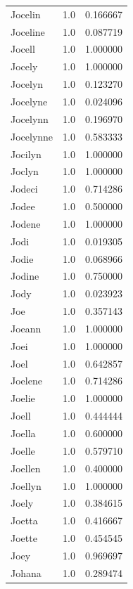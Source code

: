 \documentclass[
  letterpaper,
  DIV=11,
  numbers=noendperiod]{scrreprt}
\begin{document}
\begin{tabular}{lrr}
Jocelin         &   1.0 &   0.166667 \\
Joceline        &   1.0 &   0.087719 \\
Jocell          &   1.0 &   1.000000 \\
Jocely          &   1.0 &   1.000000 \\
Jocelyn         &   1.0 &   0.123270 \\
Jocelyne        &   1.0 &   0.024096 \\
Jocelynn        &   1.0 &   0.196970 \\
Jocelynne       &   1.0 &   0.583333 \\
Jocilyn         &   1.0 &   1.000000 \\
Joclyn          &   1.0 &   1.000000 \\
Jodeci          &   1.0 &   0.714286 \\
Jodee           &   1.0 &   0.500000 \\
Jodene          &   1.0 &   1.000000 \\
Jodi            &   1.0 &   0.019305 \\
Jodie           &   1.0 &   0.068966 \\
Jodine          &   1.0 &   0.750000 \\
Jody            &   1.0 &   0.023923 \\
Joe             &   1.0 &   0.357143 \\
Joeann          &   1.0 &   1.000000 \\
Joei            &   1.0 &   1.000000 \\
Joel            &   1.0 &   0.642857 \\
Joelene         &   1.0 &   0.714286 \\
Joelie          &   1.0 &   1.000000 \\
Joell           &   1.0 &   0.444444 \\
Joella          &   1.0 &   0.600000 \\
Joelle          &   1.0 &   0.579710 \\
Joellen         &   1.0 &   0.400000 \\
Joellyn         &   1.0 &   1.000000 \\
Joely           &   1.0 &   0.384615 \\
Joetta          &   1.0 &   0.416667 \\
Joette          &   1.0 &   0.454545 \\
Joey            &   1.0 &   0.969697 \\
Johana          &   1.0 &   0.289474 \\

\end{tabular}
\end{document}
